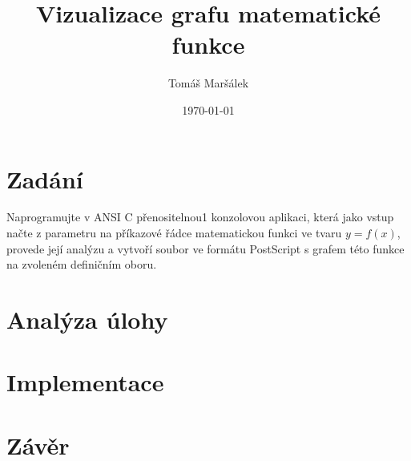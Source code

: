 \documentclass[11pt]{article}
\title{Vizualizace grafu matematické funkce}
\author{Tomáš Maršálek}
\date{\today}
\begin{document}
\maketitle

\section{Zadání}
Naprogramujte v ANSI C přenositelnou1 konzolovou aplikaci, která jako vstup
načte z parametru na příkazové řádce matematickou funkci ve tvaru $y = f(x)$,
provede její analýzu a vytvoří soubor ve formátu PostScript s grafem této
funkce na zvoleném definičním oboru.

\section{Analýza úlohy}
\section{Implementace}
\section{Závěr}
\end{document}
